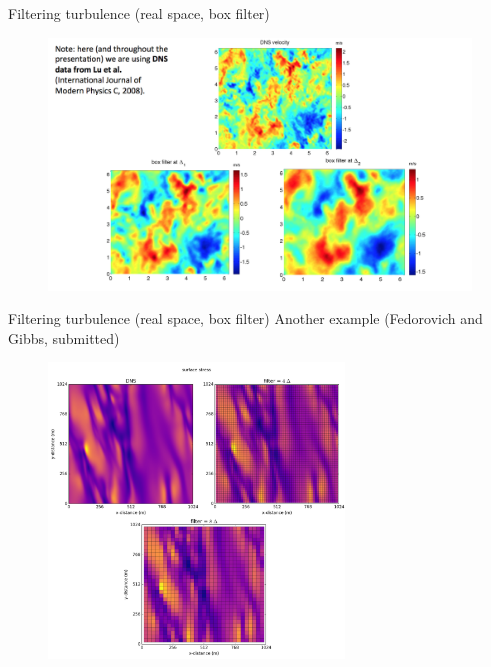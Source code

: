 \begin{frame}{Filtering turbulence (real space, box filter)}
\begin{figure}
	\includegraphics[width=1\textwidth]{filter_box1.png}
\end{figure}
\end{frame}

\begin{frame}{Filtering turbulence (real space, box filter)}
Another example (Fedorovich and Gibbs, submitted)
\begin{figure}
	\includegraphics[width=0.7\textwidth]{filter_box2.png}
\end{figure}
\end{frame}

